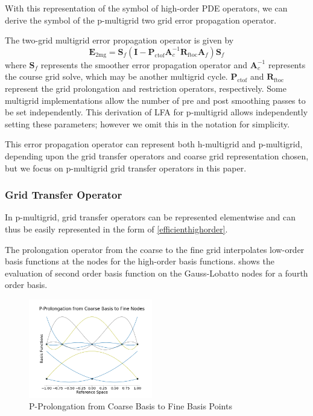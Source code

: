 \documentclass[review]{siamart190516}
\begin{document}
With this representation of the symbol of high-order PDE operators, we can derive the symbol of the p-multigrid two grid error propagation operator.

The two-grid multigrid error propagation operator is given by
\begin{equation}
\mathbf{E}_{\text{2mg}} = \mathbf{S}_f \left( \mathbf{I} - \mathbf{P}_{\text{ctof}} \mathbf{A}_c^{-1} \mathbf{R}_{\text{ftoc}} \mathbf{A}_f \right) \mathbf{S}_f
\end{equation}
where $\mathbf{S}_f$ represents the smoother error propagation operator and $\mathbf{A}_c^{-1}$ represents the course grid solve, which may be another multigrid cycle.
$\mathbf{P}_{\text{ctof}}$ and $\mathbf{R}_{\text{ftoc}}$ represent the grid prolongation and restriction operators, respectively.
Some multigrid implementations allow the number of pre and post smoothing passes to be set independently.
This derivation of LFA for p-multigrid allows independently setting these parameters; however we omit this in the notation for simplicity.

This error propagation operator can represent both h-multigrid and p-multigrid, depending upon the grid transfer operators and coarse grid representation chosen, but we focus on p-multigrid grid transfer operators in this paper.

\subsubsection{Grid Transfer Operator}\label{sec:grids}

In p-multigrid, grid transfer operators can be represented elementwise and can thus be easily represented in the form of \cref{efficienthighorder}.

The prolongation operator from the coarse to the fine grid interpolates low-order basis functions at the nodes for the high-order basis functions.
 shows the evaluation of second order basis function on the Gauss-Lobatto nodes for a fourth order basis.

\begin{figure}[!ht]
  \centering
  \includegraphics[width=0.48\textwidth]{img/pProlongation}
  \caption{P-Prolongation from Coarse Basis to Fine Basis Points}
  \label{fig:p_prolongation}
\end{figure}
\end{document}
